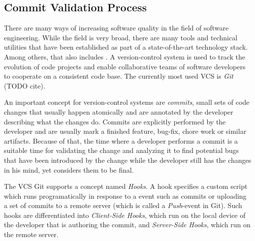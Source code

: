 \subsection{Commit Validation Process}
\label{sec:cvprocess}



There are many ways of increasing software quality in the field of software engineering. While the field is very broad, there are many tools and technical utilities that have been established as part of a state-of-the-art technology stack. Among others, that also includes . A version-control system is used to track the evolution of code projects and enable collaborative teams of software developers to cooperate on a consistent code base. The currently most used VCS is \textit{Git} (TODO cite). \cite{Chacon:2014:PG:2695634}

An important concept for version-control systems are \textit{commits}, small sets of code changes that usually happen atomically and are annotated by the developer describing what the changes do. Commits are explicitly performed by the developer and are usually mark a finished feature, bug-fix, chore work or similar artifacts. Because of that, the time where a developer performs a commit is a suitable time for validating the change and analyzing it to find potential bugs that have been introduced by the change while the developer still has the changes in his mind, yet considers them to be final. %

The VCS Git supports a concept named \textit{Hooks}. A hook specifies a custom script which runs programatically in response to a event such as commits or uploading a set of commits to a remote server (which is called a \textit{Push}-event in Git). Such hooks are differentiated into \textit{Client-Side Hooks}, which run on the local device of the developer that is authoring the commit, and \textit{Server-Side Hooks}, which run on the remote server. \cite{Chacon:2014:PG:2695634}

